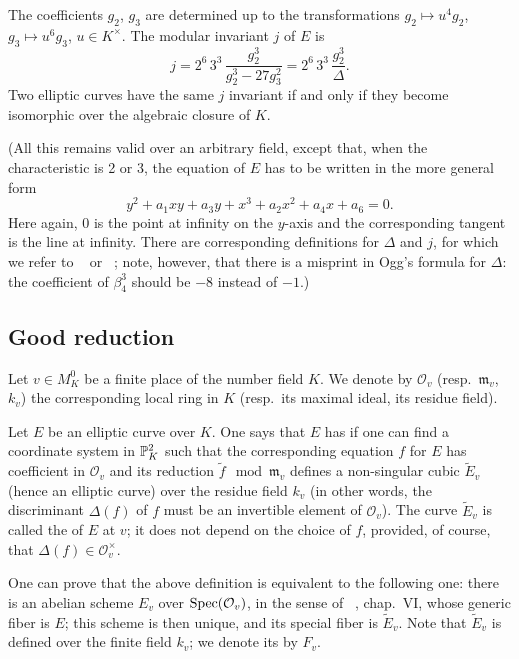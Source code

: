 The coefficients $g_2$, $g_3$ are determined up to the transformations $g_2
\mapsto u^4 g_2$, $g_3 \mapsto u^6 g_3$, $u \in K^\times$. The modular
invariant $j$ of $E$ is
\[
	j = 2^6 \, 3^3 \, \frac{g_2^3}{g_2^3 - 27g_3^2}
	= 2^6 \, 3^3 \, \frac{g_2^3}{\Delta}.
\]
\dpage
Two elliptic curves have the same $j$ invariant if and only if they become
isomorphic over the algebraic closure of $K$.

(All this remains valid over an arbitrary field, except that, when the
characteristic is 2 or 3, the equation of $E$ has to be written in the more
general form
\[
	y^2 + a_1xy + a_3y + x^3 + a_2x^2 + a_4x + a_6 = 0.
\]
Here again, 0 is the point at infinity on the $y$-axis and the 
corresponding tangent is the line at infinity. There are corresponding
definitions for $\Delta$ and $j$, for which we refer to \citeauthor{9}~\cite{9}
or \citeauthor{20}~\cite{20}; note, however, that there is a misprint in Ogg's
formula for $\Delta$: the coefficient of $\beta_4^3$ should be $-8$ instead of
$-1$.)

\subsection{Good reduction}
\label{sec:IV_12}
Let $v \in M_K^0$ be a finite place of the number field $K$. We denote by
$\mathcal{O}_v$ (resp.\ $\mathfrak{m}_v$, $k_v$) the corresponding local ring
in $K$ (resp.\ its maximal ideal, its residue field).

Let $E$ be an elliptic curve over $K$. One says that $E$ has  if one can find a coordinate system in $\mathbb{P}^2_K$ such that
the corresponding equation $f$ for $E$ has coefficient in $\mathcal{O}_v$ and
its reduction $\tilde f \mod{\mathfrak{m}_v}$ defines a non-singular cubic
$\widetilde{E}_v$ (hence an elliptic curve) over the residue field $k_v$ (in
other words, the discriminant $\Delta(f)$ of $f$ must be an invertible element
of $\mathcal{O}_v$).
The curve $\widetilde{E}_v$ is called the  of $E$ at $v$;
\dpage
it does not depend on the choice of $f$, provided, of course, that $\Delta(f) \in
\mathcal{O}_v^\times$.

One can prove that the above definition is equivalent to the following one:
there is an abelian scheme $E_v$ over $\operatorname{Spec}(\mathcal{O}_v)$, in the sense of
\citeauthor{19}~\cite{19}, chap.\ VI, whose generic fiber is $E$; this scheme
is then unique, and its special fiber is $\widetilde{E}_v$. Note that
$\widetilde{E}_v$ is defined over the finite field $k_v$; we denote its
 by $F_v$.

